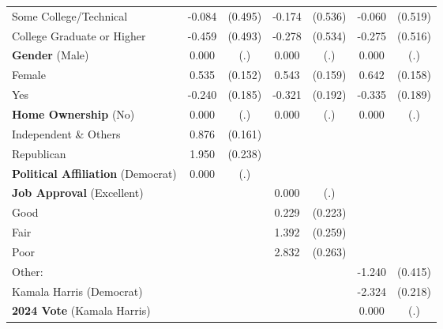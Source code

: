 \begin{table}[htbp]
\begin{tabular}{l*{3}{cc}}
Some College/Technical&      -0.084         &     (0.495)&      -0.174         &     (0.536)&      -0.060         &     (0.519)\\
College Graduate or Higher&      -0.459         &     (0.493)&      -0.278         &     (0.534)&      -0.275         &     (0.516)\\
\textbf{Gender} (Male)&       0.000         &         (.)&       0.000         &         (.)&       0.000         &         (.)\\
Female              &       0.535\sym{***}&     (0.152)&       0.543\sym{***}&     (0.159)&       0.642\sym{***}&     (0.158)\\
Yes                 &      -0.240         &     (0.185)&      -0.321\sym{*}  &     (0.192)&      -0.335\sym{*}  &     (0.189)\\
\textbf{Home Ownership} (No)&       0.000         &         (.)&       0.000         &         (.)&       0.000         &         (.)\\
Independent \& Others&       0.876\sym{***}&     (0.161)&                     &            &                     &            \\
Republican          &       1.950\sym{***}&     (0.238)&                     &            &                     &            \\
\textbf{Political Affiliation} (Democrat)&       0.000         &         (.)&                     &            &                     &            \\
\textbf{Job Approval} (Excellent)&                     &            &       0.000         &         (.)&                     &            \\
Good                &                     &            &       0.229         &     (0.223)&                     &            \\
Fair                &                     &            &       1.392\sym{***}&     (0.259)&                     &            \\
Poor                &                     &            &       2.832\sym{***}&     (0.263)&                     &            \\
Other:              &                     &            &                     &            &      -1.240\sym{***}&     (0.415)\\
Kamala Harris (Democrat)&                     &            &                     &            &      -2.324\sym{***}&     (0.218)\\
\textbf{2024 Vote} (Kamala Harris)&                     &            &                     &            &       0.000         &         (.)\\

\end{tabular}
\end{table}
